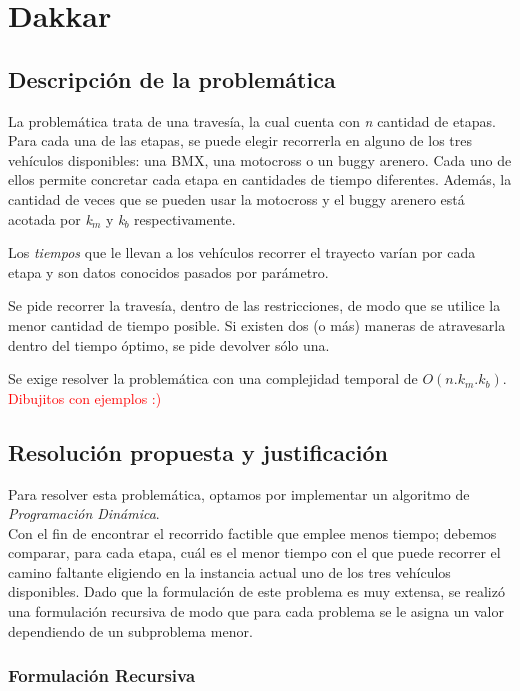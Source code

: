 \section{Dakkar}
\subsection{Descripci\'on de la problem\'atica}
La problem\'atica trata de una traves\'ia, la cual cuenta con \emph{n} cantidad de etapas. Para cada una de las etapas, se puede elegir recorrerla en alguno de los tres veh\'iculos disponibles: una BMX, una motocross o un buggy arenero. Cada uno de ellos permite concretar cada etapa en cantidades de tiempo diferentes. Adem\'as, la cantidad de veces que se pueden usar la motocross y el buggy arenero est\'a acotada por \emph{k}$_m$ y \emph{k}$_b$ respectivamente.

Los \emph{tiempos} que le llevan a los veh\'iculos recorrer el trayecto var\'ian por cada etapa y son datos conocidos pasados por par\'ametro.

Se pide recorrer la traves\'ia, dentro de las restricciones, de modo que se utilice la menor cantidad de tiempo posible. Si existen dos (o m\'as) maneras de atravesarla dentro del tiempo \'optimo, se pide devolver s\'olo una.

Se exige resolver la problem\'atica con una complejidad temporal de $O(n.k_m.k_b)$.\\

\textcolor{red}{Dibujitos con ejemplos :)}

\newpage
\subsection{Resoluci\'on propuesta y justificaci\'on}

Para resolver esta problem\'atica, optamos por implementar un algoritmo de \emph{Programaci\'on Din\'amica}.\\

Con el fin de encontrar el recorrido factible que emplee menos tiempo; debemos comparar, para cada etapa, cu\'al es el menor tiempo con el que puede recorrer el camino faltante eligiendo en la instancia actual uno de los tres veh\'iculos disponibles. Dado que la formulaci\'on de este problema es muy extensa, se realiz\'o una formulaci\'on recursiva de modo que para cada problema se le asigna un valor dependiendo de un subproblema menor. 

\subsubsection*{Formulaci\'on Recursiva}

